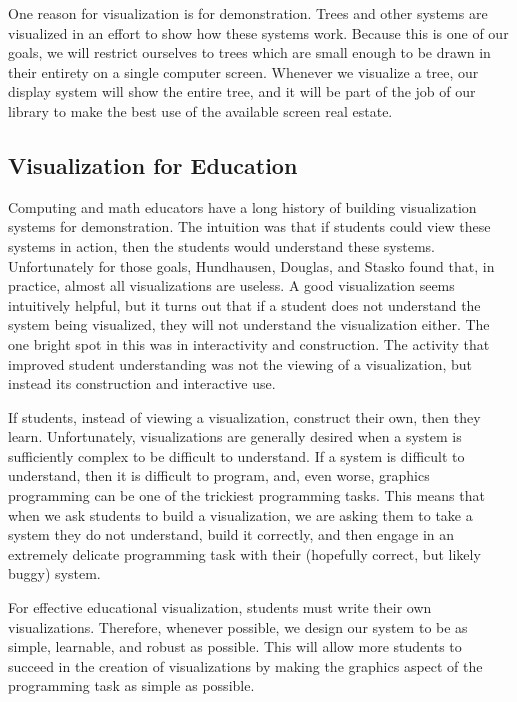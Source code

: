 \documentclass{article}
\begin{document}
One reason for visualization is for demonstration.  Trees and other systems
are visualized in an effort to show how these systems work.  Because this is
one of our goals, we will restrict ourselves to trees which are small enough to
be drawn in their entirety on a single computer screen.  Whenever we visualize a tree, our display system will show the entire tree, and it will be part of the job of our library to make the best use of the available screen real estate.

\subsection{Visualization for Education}
\label{educ}

Computing and math educators have a long history of building visualization
systems for demonstration.  The intuition was that if students could view these
systems in action, then the students would understand these systems.
Unfortunately for those goals, Hundhausen, Douglas, and Stasko found that, in practice, almost all
visualizations are useless\cite{hds}.  A good visualization seems intuitively helpful, but
it turns out that if a student does not understand the system being visualized, they will not understand the visualization either.  The one bright spot in this was in interactivity and construction.  The activity that improved student understanding was not the viewing of a visualization, but instead its construction and interactive use.

If students, instead of viewing a visualization, construct their own, then they
learn.  Unfortunately, visualizations are generally desired when a system is
sufficiently complex to be difficult to understand.  If a system is difficult
to understand, then it is difficult to program, and, even worse, graphics
programming can be one of the trickiest programming tasks.  This means
that when we ask students to build a visualization, we are asking them to take
a system they do not understand, build it correctly, and then engage in an
extremely delicate programming task with their (hopefully correct, but likely
buggy) system.

For effective educational visualization, students must write their own
visualizations.  Therefore, whenever possible, we design our system to be as
simple, learnable, and robust as possible.  This will allow more students to
succeed in the creation of visualizations by making the graphics
aspect of the programming task as simple as possible.
\end{document}
